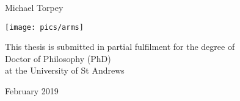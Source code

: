 \begin{titlepage}
  \centering

  \null
  \vspace{2em}

  {\Huge \textbf{\printtitle} \par}
  \vspace{7em}

  {\huge Michael Torpey}
  \vspace{6em}

  \texttt{[image: pics/arms]}
  \vspace{6em}

  {\large \doublespacing
    This thesis is submitted in partial fulfilment for the degree of\\
    Doctor of Philosophy (PhD)\\
    at the University of St Andrews \par}
  \vspace{7em}

  {\Large February 2019}
\end{titlepage}
